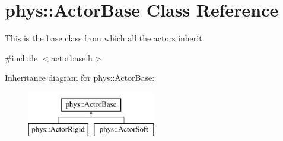 \hypertarget{classphys_1_1ActorBase}{
\section{phys::ActorBase Class Reference}
\label{d8/d0f/classphys_1_1ActorBase}
}


This is the base class from which all the actors inherit.  




{\ttfamily \#include $<$actorbase.h$>$}

Inheritance diagram for phys::ActorBase:\begin{figure}[H]
\begin{center}
\leavevmode
\includegraphics[height=2cm]{d8/d0f/classphys_1_1ActorBase}
\end{center}
\end{figure}

